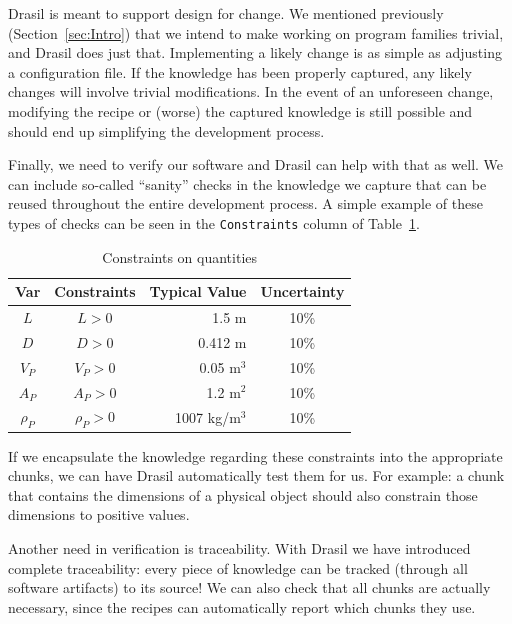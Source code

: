 \documentclass[preprint, 10pt]{sigplanconf}
\begin{document}
Drasil is meant to support design for change. We mentioned previously
(Section~\ref{sec:Intro}) that we intend to make working on program families
trivial, and Drasil does just that. Implementing a likely change is as simple as
adjusting a configuration file. If the knowledge has been properly captured, any
likely changes will involve trivial modifications. In the event of an unforeseen
change, modifying the recipe or (worse) the captured knowledge is still possible
and should end up simplifying the development process.

Finally, we need to verify our software and Drasil can help with that as well.
We can include so-called ``sanity'' checks in the knowledge we capture that can
be reused throughout the entire development process. A simple example of these
types of checks can be seen in the \verb|Constraints| column of
Table~\ref{tab:constraints}.

\begin{table} 
\centering
\nocaptionrule \caption{Constraints on quantities}
\begin{tabular}{|c|c|r|c|} \hline
\textbf{Var} & \textbf{Constraints} & \textbf{Typical Value} &
\textbf{Uncertainty}\\ \hline
$L$ & $L > 0$ & 1.5 m & 10\% \\ \hline
$D$ & $D > 0$ & 0.412 m & 10\% \\ \hline
$V_P$ & $V_P > 0$ & 0.05 m$^3$	& 10\% \\ \hline
$A_P$ & $A_P > 0$ & 1.2 m$^2$	& 10\% \\ \hline
$\rho_P$ & $\rho_P > 0$	& 1007 kg/m$^3$	& 10\% \\
\hline\end{tabular}
\label{tab:constraints}
\end{table}

If we encapsulate the knowledge regarding these constraints into the appropriate
chunks, we can have Drasil automatically test them for us. For example: a chunk
that contains the dimensions of a physical object should also constrain those
dimensions to positive values.


Another need in verification is traceability. With Drasil we have introduced
complete traceability: every piece of knowledge can be tracked (through all
software artifacts) to its source! We can also check that all chunks are
actually necessary, since the recipes can automatically report which chunks they
use.
\end{document}
